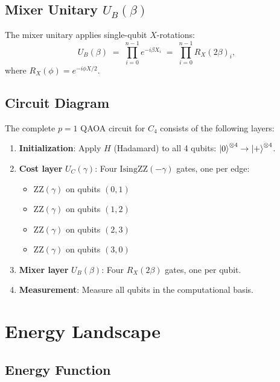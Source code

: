\documentclass[11pt,a4paper]{article}
\begin{document}
\subsection{Mixer Unitary $U_B(\beta)$}

The mixer unitary applies single-qubit $X$-rotations:
\begin{equation}\label{eq:UB}
  U_B(\beta) \;=\; \prod_{i=0}^{n-1} e^{-i\beta X_i}
  \;=\; \prod_{i=0}^{n-1} R_X(2\beta)_i,
\end{equation}
where $R_X(\phi) = e^{-i\phi X/2}$.

\subsection{Circuit Diagram}

The complete $p=1$ QAOA circuit for $C_4$ consists of the following layers:

\begin{enumerate}
  \item \textbf{Initialization}: Apply $H$ (Hadamard) to all 4 qubits:
        $\ket{0}^{\otimes 4} \to \ket{+}^{\otimes 4}$.
  \item \textbf{Cost layer} $U_C(\gamma)$: Four $\mathrm{IsingZZ}(-\gamma)$
        gates, one per edge:
        \begin{itemize}
          \item $\mathrm{ZZ}(\gamma)$ on qubits $(0,1)$
          \item $\mathrm{ZZ}(\gamma)$ on qubits $(1,2)$
          \item $\mathrm{ZZ}(\gamma)$ on qubits $(2,3)$
          \item $\mathrm{ZZ}(\gamma)$ on qubits $(3,0)$
        \end{itemize}
  \item \textbf{Mixer layer} $U_B(\beta)$: Four $R_X(2\beta)$ gates, one per
        qubit.
  \item \textbf{Measurement}: Measure all qubits in the computational basis.
\end{enumerate}

\section{Energy Landscape}\label{sec:landscape}

\subsection{Energy Function}
\end{document}
